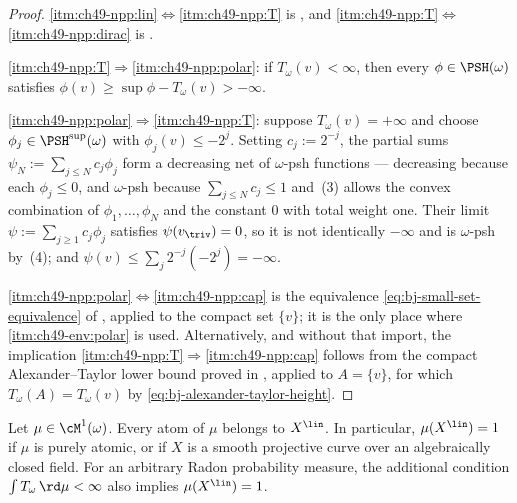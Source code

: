 \begin{proof}
\cref{itm:ch49-npp:lin}$\Leftrightarrow$\cref{itm:ch49-npp:T} is
, and
\cref{itm:ch49-npp:T}$\Leftrightarrow$\cref{itm:ch49-npp:dirac} is
.

\cref{itm:ch49-npp:T}$\Rightarrow$\cref{itm:ch49-npp:polar}: if
$T_\omega(v)<\infty$, then every $\phi\in\PSH(\omega)$ satisfies
$\phi(v)\ge\sup\phi-T_\omega(v)>-\infty$.

\cref{itm:ch49-npp:polar}$\Rightarrow$\cref{itm:ch49-npp:T}: suppose
$T_\omega(v)=+\infty$ and choose $\phi_j\in\PSH^{\sup}(\omega)$ with
$\phi_j(v)\le-2^{j}$.  Setting $c_j:=2^{-j}$, the partial sums
$\psi_N:=\sum_{j\le N}c_j\phi_j$ form a decreasing net of
$\omega$-psh functions --- decreasing because each $\phi_j\le0$, and
$\omega$-psh because $\sum_{j\le N}c_j\le1$ and
\,(3) allows the convex combination of
$\phi_1,\dots,\phi_N$ and the constant $0$ with total weight one.
Their limit $\psi:=\sum_{j\ge1}c_j\phi_j$ satisfies
$\psi(v_{\triv})=0$, so it is not identically $-\infty$ and is
$\omega$-psh by \,(4); and
$\psi(v)\le\sum_j 2^{-j}(-2^{j})=-\infty$.

\cref{itm:ch49-npp:polar}$\Leftrightarrow$\cref{itm:ch49-npp:cap} is the
equivalence \eqref{eq:bj-small-set-equivalence} of
, applied to the compact set
$\{v\}$; it is the only place where
\,\cref{itm:ch49-env:polar} is used.  Alternatively,
and without that import, the implication
\cref{itm:ch49-npp:T}$\Rightarrow$\cref{itm:ch49-npp:cap} follows from the
compact Alexander--Taylor lower bound proved in
, applied to $A=\{v\}$, for which
$T_\omega(A)=T_\omega(v)$ by
\eqref{eq:bj-alexander-taylor-height}.
\end{proof}

\begin{corollary}
\label{cor:ch49-mass-in-lin}
Let $\mu\in\cM^1(\omega)$.  Every atom of $\mu$ belongs to $X^{\lin}$.
In particular, $\mu(X^{\lin})=1$ if $\mu$ is purely atomic, or if $X$ is
a smooth projective curve over an algebraically closed field.
For an arbitrary Radon probability measure, the additional condition
$\int T_\omega\,\rd\mu<\infty$ also implies $\mu(X^{\lin})=1$.
\end{corollary}

